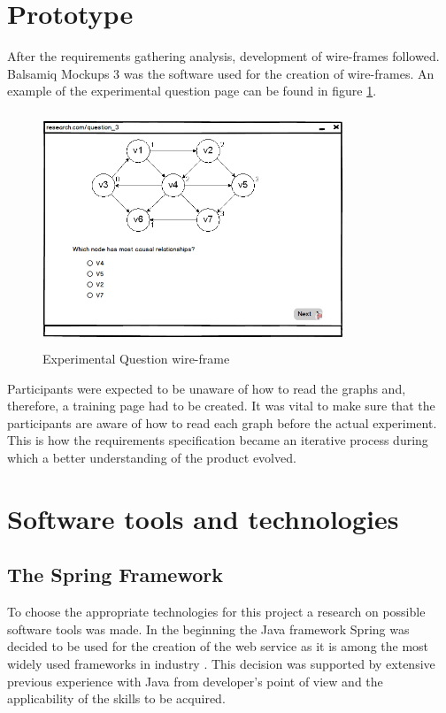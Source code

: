 \documentclass{l4proj}
\begin{document}
\section{Prototype}
After the requirements gathering analysis, development of wire-frames followed. Balsamiq Mockups 3 was the software used for the creation of wire-frames. An example of the experimental question page can be found in figure \ref{researchQuestion}.

\begin{figure}[H]
\centering
\includegraphics[width=9cm,height=7cm]{researchQuestion.PNG}
\caption{Experimental Question wire-frame}
\label{researchQuestion}
\end{figure}
 
Participants were expected to be unaware of how to read the graphs and, therefore, a training page had to be created. It was vital to make sure that the participants are aware of how to read each graph before the actual experiment. This is how the requirements specification became an iterative process during which a better understanding of the product evolved.

\section{Software tools and technologies}

\subsection{The Spring Framework}

To choose the appropriate technologies for this project a research on possible software tools was made. In the beginning the Java framework Spring was decided to be used for the creation of the web service as it is among the most widely used frameworks in industry \cite{shiLuiLi}. This decision was supported by extensive previous experience with Java from developer's point of view and the applicability of the skills to be acquired.
\end{document}
